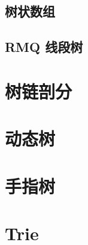 	\subsection{树状数组}\small


	\subsection{RMQ 线段树}\small


\section{树链剖分}\small


\section{动态树}\small


\section{手指树}\small


\section{Trie}\small

